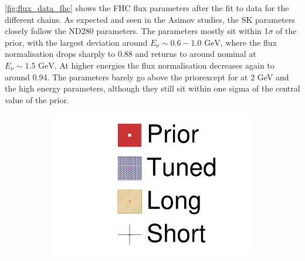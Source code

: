 \autoref{fig:flux_data_fhc} shows the FHC flux parameters after the fit to data for the different chains. As expected and seen in the Asimov studies, the SK parameters closely follow the ND280 parameters. The parameters mostly sit within 1$\sigma$ of the prior, with the largest deviation around $E_\nu \sim 0.6-1.0\text{ GeV}$, where the flux normalisation drops sharply to 0.88 and returns to around nominal at $E_\nu\sim1.5\text{ GeV}$. At higher energies the flux normalisation decreases again to around 0.94. The parameters barely go above the priorexcept for \nue at 2 GeV and the high energy \nuebar parameters, although they still sit within one sigma of the central value of the prior.
\begin{figure}[h]
	\begin{subfigure}[t]{0.10\textwidth}
		\includegraphics[width=\textwidth, trim={0mm 0mm 0mm 0mm}, clip,page=1]{figures/mach3/data/2017b_NewData_NewDet_UpdXsecStep_2Xsec_4Det_5Flux_0_2017b_June_NewDet_merge_2017b_NewDet_June_Long_0}
	\end{subfigure}
	

\end{figure}
